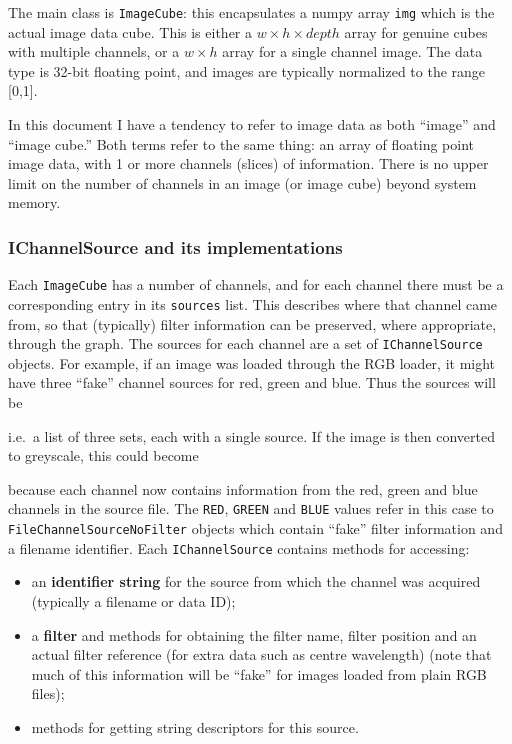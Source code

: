 The main class is \texttt{ImageCube}: this encapsulates a numpy array
\texttt{img}
which is the actual image data cube. This is either a 
$w \times h \times depth$ array for genuine cubes with multiple channels,
or a $w \times h$ array for a single channel image. The data type is 32-bit floating
point, and images are typically normalized to the range [0,1].

\begin{notebox}
In this document I have a tendency to refer to image data as both ``image'' and ``image cube.''
Both terms refer to the same thing: an array of floating point image data, with 1 or more channels (slices)
of information. There is no upper limit on the number of channels in an image (or image cube)
beyond system memory.
\end{notebox}


\subsubsection{IChannelSource and its implementations}
Each \texttt{ImageCube} has a number of channels, and for each channel there must be a corresponding
entry in its \texttt{sources} list. This describes where that channel came from, so that (typically) filter
information can be preserved, where appropriate, through the graph. The sources for each channel are a set
of \texttt{IChannelSource} objects. For example, if an image was loaded through the RGB loader, it might
have three ``fake'' channel sources for red, green and blue. Thus the sources will be 
\begin{v}
\end{v}
i.e.\ a list of three sets, each with a single source.
If the image is then converted to greyscale, this could
become
\begin{v}
\end{v}
because each channel now contains information from the red, green and blue channels in the source file.
The \texttt{RED}, \texttt{GREEN} and \texttt{BLUE} values refer in this case to \texttt{FileChannelSourceNoFilter} objects
which contain ``fake'' filter information and a filename identifier.
Each \texttt{IChannelSource} contains methods for accessing:
\begin{itemize}
\item an \textbf{identifier string} for the source from which the channel was acquired (typically a filename or data ID);
\item a \textbf{filter} and methods for obtaining the filter name, filter position and an actual filter reference (for extra data such as centre wavelength) (note
that much of this information will be ``fake'' for images loaded from plain RGB files);
\item methods for getting string descriptors for this source.
\end{itemize}

